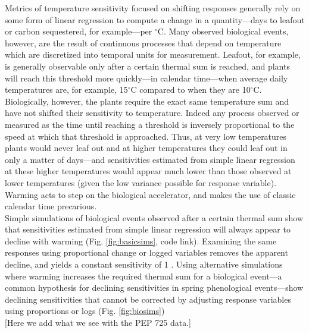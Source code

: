 \documentclass[11pt,letter]{article}
\begin{document}
Metrics of temperature sensitivity focused on shifting responses generally rely on some form of linear regression to compute a change in a quantity---days to leafout or carbon sequestered, for example---per $^{\circ}$C. Many observed biological events, however, are the result of continuous processes that depend on temperature which are discretized into temporal units for measurement. Leafout, for example, is generally observable only after a certain thermal sum is reached, and plants will reach this threshold more quickly---in calendar time---when average daily temperatures are, for example, 15$^{\circ}$C compared to when they are 10$^{\circ}$C. Biologically, however, the plants require the exact same temperature sum and have not shifted their sensitivity to temperature. Indeed any process observed or measured as the time until reaching a threshold is inversely proportional to the speed at which that threshold is approached. Thus, at very low temperatures plants would never leaf out and at higher temperatures they could leaf out in only a matter of days---and sensitivities estimated from simple linear regression at these higher temperatures would appear much lower than those observed at lower temperatures (given the low variance possible for response variable). Warming acts to step on the biological accelerator, and makes the use of classic calendar time precarious. \\

Simple simulations of biological events observed after a certain thermal sum show that sensitivities estimated from simple linear regression will always appear to decline with warming (Fig. \ref{fig:basicsims}, code link). Examining the same responses using proportional change or logged variables removes the apparent decline, and yields a constant sensitivity of 1 \citep[the expected slope given that these sensitivities are effectively include temperature as both the predictor and response variable, ][]{nee2005}. Using alternative simulations where warming increases the required thermal sum for a biological event---a common hypothesis for declining sensitivities in spring phenological events---show declining sensitivities that cannot be corrected by adjusting response variables using proportions or logs (Fig. \ref{fig:biosims}) \\

[Here we add what we see with the PEP 725 data.] \\
\end{document}
